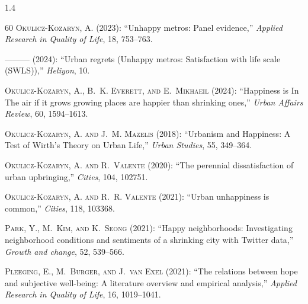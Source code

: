 \documentclass[10pt, letterpaper]{article}
\begin{document}
\begin{spacing}{1.4}
\begin{thebibliography}{60}
\textsc{Okulicz-Kozaryn, A.} (2023): \enquote{Unhappy metros: Panel evidence,}
  \emph{Applied Research in Quality of Life}, 18, 753--763.

---\hspace{-.1pt}---\hspace{-.1pt}--- (2024): \enquote{Urban regrets (Unhappy
  metros: Satisfaction with life scale (SWLS)),} \emph{Heliyon}, 10.

\textsc{Okulicz-Kozaryn, A., B.~K. Everett, and E.~Mikhaeil} (2024):
  \enquote{Happiness is In The air if it grows growing places are happier than
  shrinking ones,} \emph{Urban Affairs Review}, 60, 1594--1613.

\textsc{Okulicz-Kozaryn, A. and J.~M. Mazelis} (2018): \enquote{Urbanism and
  Happiness: A Test of Wirth's Theory on Urban Life,} \emph{Urban Studies}, 55,
  349--364.

\textsc{Okulicz-Kozaryn, A. and R.~Valente} (2020): \enquote{The perennial
  dissatisfaction of urban upbringing,} \emph{Cities}, 104, 102751.

\textsc{Okulicz-Kozaryn, A. and R.~R. Valente} (2021): \enquote{Urban
  unhappiness is common,} \emph{Cities}, 118, 103368.

\textsc{Park, Y., M.~Kim, and K.~Seong} (2021): \enquote{Happy neighborhoods:
  Investigating neighborhood conditions and sentiments of a shrinking city with
  Twitter data,} \emph{Growth and change}, 52, 539--566.

\textsc{Pleeging, E., M.~Burger, and J.~van Exel} (2021): \enquote{The
  relations between hope and subjective well-being: A literature overview and
  empirical analysis,} \emph{Applied Research in Quality of Life}, 16,
  1019--1041.


\end{thebibliography}
\end{spacing}
\end{document}
